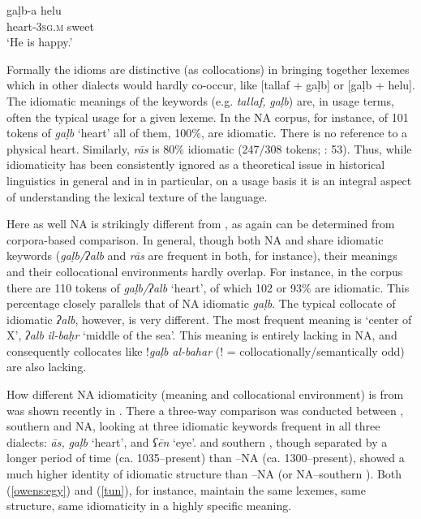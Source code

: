 \documentclass[output=paper]{langsci/langscibook}
\begin{document}
\ex
\gll gaḷb-a helu\\
     heart-\textsc{3sg.m} sweet\\
\glt ‘He is happy.’\label{helu}
\z
\z

Formally the {idioms} are distinctive (as  collocations) in bringing together lexemes which in other dialects would hardly co-occur, like [tallaf + gaḷb] or [gaḷb + helu]. The {idiomatic} meanings of the keywords (e.g. \textit{tallaf,} \textit{gaḷb}) are, in usage terms, often the typical usage for a given lexeme. In the NA corpus, for instance, of 101 tokens of \textit{gaḷb} ‘heart’ all of them, 100\%, are {idiomatic}. There is no reference to a physical heart. Similarly, \textit{rās} is 80\% {idiomatic} (247/308 tokens; \citealt{Ritt-Benmimounetc2017}: 53). Thus, while {idiomaticity} has been consistently ignored as a theoretical issue in historical linguistics in general and in  in particular, on a usage basis it is an integral aspect of understanding the lexical texture of the language.


Here as well NA is strikingly different from , as again can be determined from corpora-based comparison. In general, though both NA and  share {idiomatic} keywords (\textit{gaḷb/ʔalb} and \textit{rās} are frequent in both, for instance), their meanings and their collocational environments hardly overlap. For instance, in the  corpus there are 110 tokens of \textit{gaḷb/ʔalb} ‘heart’, of which 102 or 93\% are {idiomatic}. This percentage closely parallels that of NA {idiomatic} \textit{gaḷb}. The typical  {collocate} of {idiomatic} \textit{ʔalb}, however, is very different. The most frequent meaning is ‘center of X’, \textit{ʔalb} \textit{il-baḥr} ‘middle of the sea’. This meaning is entirely lacking in NA, and consequently {collocates} like !\textit{gaḷb} \textit{al-bahar} (! = collocationally\slash semantically odd) are also lacking.

How different NA {idiomaticity} (meaning and collocational environment) is from  was shown recently in \citet{Ritt-Benmimounetc2017}. There a three-way comparison was conducted between , southern   and NA, looking at three {idiomatic} keywords frequent in all three dialects: \textit{{\R}ās,} \textit{gaḷb} ‘heart’, and \textit{ʕēn} ‘eye’.  and southern , though separated by a longer period of time (ca. 1035–present) than –NA (ca. 1300–present), showed a much higher {identity} of {idiomatic} structure than –NA (or NA–southern ). Both  (\ref{owens:egy}) and   (\ref{tun}), for instance, maintain the same lexemes, same structure, same {idiomaticity} in a highly specific meaning.
\end{document}
